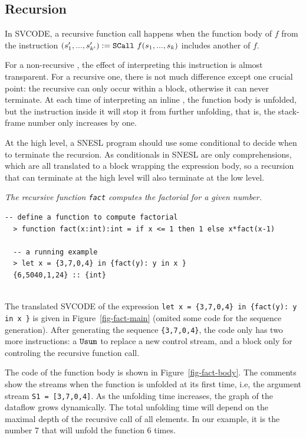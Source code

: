 \subsection{Recursion}

In SVCODE, a recursive function call happens when the function body of $f$ from the instruction $\scall{f}{s_1,...,s_k}{(s_1',...,s'_{k'})}$ includes another \sc of  $f$.


For a non-recursive \sc, the effect of interpreting this instruction is almost transparent. 
For a recursive one, there is not much difference except one crucial point: the recursive \sc can only occur within a \wc block, otherwise it can never terminate.
At each time of interpreting an inline \sc, the function body is unfolded, but the \wc instruction inside it will stop it from further unfolding, that is, the stack-frame number only increases by one. 

At the high level, a SNESL program should use some conditional to decide when to terminate the recursion. 
As conditionals in SNESL are only comprehensions, which are all translated to a \wc block wrapping the expression body,
so a recursion that can terminate at the high level will also terminate at the low level. 


\begin{example} \emph{The recursive function \texttt{fact} computes the factorial for a given number.}
\end{example}
\begin{lstlisting}[style=nesl-style]
  -- define a function to compute factorial
  > function fact(x:int):int = if x <= 1 then 1 else x*fact(x-1)
  
  -- a running example
  > let x = {3,7,0,4} in {fact(y): y in x }
  {6,5040,1,24} :: {int}
\end{lstlisting}

\hspace{1cm}\\
The translated SVCODE of the expression \texttt{let x = \{3,7,0,4\} in \{fact(y): y in x \}} is given in Figure~\ref{fig-fact-main} (omited some code for the sequence generation). After generating the sequence \texttt{\{3,7,0,4\}}, 
the code only has two more instructions: a $\usum$ to replace a new control stream, and a \wc block only for controling the recursive function call. 


The code of the function body is shown in Figure~\ref{fig-fact-body}. 
The comments show the streams when the function is unfolded at its first time, i.e, the argument stream \texttt{S1 = [3,7,0,4]}. 
As the unfolding time increases, the graph of the dataflow grows dynamically. 
The total unfolding time will depend on the maximal depth of the recursive call of all elements. 
In our example, it is the number 7 that will unfold the function 6 times.\\

